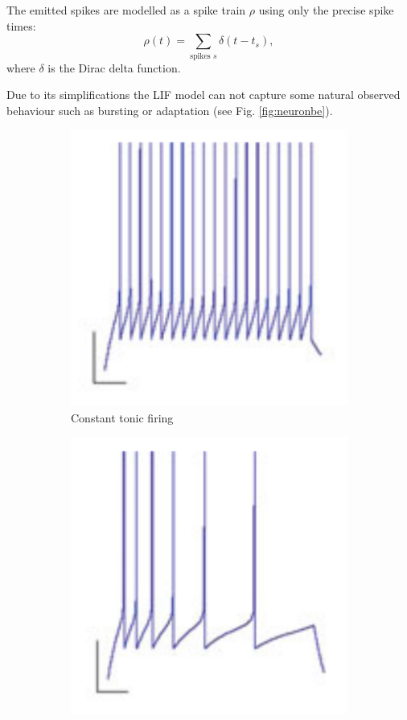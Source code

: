 The emitted spikes are modelled as a spike train $\rho$ using only the precise spike times:
\[
\rho(t) = \sum_{\text{spikes } s} \delta(t-t_s),
\] 
where $\delta$ is the Dirac delta function.

Due to its simplifications the LIF model can not capture some natural observed behaviour such as bursting or adaptation (see Fig. \ref{fig:neuronbe}). 

\begin{figure}
	\centering
	\begin{subfigure}[t]{.32\textwidth}
	 	\centering
  		\includegraphics[width=.9\linewidth]{imgs/lif_bad1.png}
  		\caption{Constant tonic firing}
	\end{subfigure}
	\begin{subfigure}[t]{.32\textwidth}
	 	\centering
  		\includegraphics[width=.9\linewidth]{imgs/lif_bad2.png}

\end{subfigure}
\end{figure}
